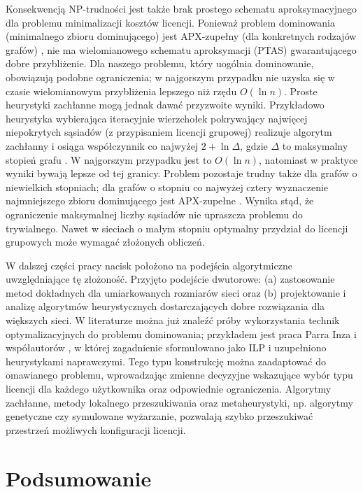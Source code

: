 Konsekwencją NP-trudności jest także brak prostego schematu aproksymacyjnego dla problemu minimalizacji kosztów licencji. Ponieważ problem dominowania (minimalnego zbioru dominującego) jest APX-zupełny (dla konkretnych rodzajów grafów) \cite{POUREIDI2023106363}, nie ma wielomianowego schematu aproksymacji (PTAS) gwarantującego dobre przybliżenie. Dla naszego problemu, który uogólnia dominowanie, obowiązują podobne ograniczenia; w najgorszym przypadku nie uzyska się w czasie wielomianowym przybliżenia lepszego niż rzędu $O(\ln n)$. Proste heurystyki zachłanne mogą jednak dawać przyzwoite wyniki. Przykładowo heurystyka wybierająca iteracyjnie wierzchołek pokrywający najwięcej niepokrytych sąsiadów (z przypisaniem licencji grupowej) realizuje algorytm zachłanny i osiąga współczynnik co najwyżej $2+\ln \Delta$, gdzie $\Delta$ to maksymalny stopień grafu \cite{Kuhn2012NetworkAlgorithms}. W najgorszym przypadku jest to $O(\ln n)$, natomiast w praktyce wyniki bywają lepsze od tej granicy. Problem pozostaje trudny także dla grafów o niewielkich stopniach; dla grafów o stopniu co najwyżej cztery wyznaczenie najmniejszego zbioru dominującego jest APX-zupełne \cite{ALIMONTI2000123,POUREIDI2023106363}.
Wynika stąd, że ograniczenie maksymalnej liczby sąsiadów nie upraszcza problemu do trywialnego. Nawet w sieciach o małym stopniu optymalny przydział do licencji grupowych może wymagać złożonych obliczeń.

W dalszej części pracy nacisk położono na podejścia algorytmiczne uwzględniające tę złożoność. Przyjęto podejście dwutorowe: (a) zastosowanie metod dokładnych dla umiarkowanych rozmiarów sieci oraz (b) projektowanie i analizę algorytmów heurystycznych dostarczających dobre rozwiązania dla większych sieci. W literaturze można już znaleźć próby wykorzystania technik optymalizacyjnych do problemu dominowania; przykładem jest praca Parra Inza i współautorów \cite{PARRAINZA2024926}, w której zagadnienie sformułowano jako ILP i uzupełniono heurystykami naprawczymi. Tego typu konstrukcję można zaadaptować do omawianego problemu, wprowadzając zmienne decyzyjne wskazujące wybór typu licencji dla każdego użytkownika oraz odpowiednie ograniczenia. Algorytmy zachłanne, metody lokalnego przeszukiwania oraz metaheurystyki, np. algorytmy genetyczne czy symulowane wyżarzanie, pozwalają szybko przeszukiwać przestrzeń możliwych konfiguracji licencji.

\section{Podsumowanie}

